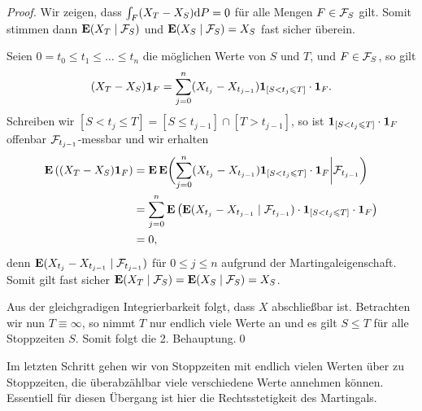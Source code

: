 \begin{proof}
Wir zeigen, dass $\int_F (X_T - X_S) \mathrm{d} P = 0$ für alle Mengen $F\in
\mathcal{F}_S$ gilt. Somit stimmen dann $\mathbf{E}(X_T\mid\mathcal{F}_S)$ und $\mathbf{E}(X_S\mid\mathcal{F}_S) = X_S$
fast sicher überein.

Seien $0 = t_0\le t_1 \le \ldots \le t_n$ die möglichen Werte von $S$ und $T$,
und $F\in\mathcal{F}_S$, so gilt
\begin{align*}
(X_T-X_S)\mathbf{1}_{F} = \sum_{j=0}^n (X_{t_j}-X_{t_{j-1}})\mathbf{1}_{[S < t_j \leqslant
T]}\cdot \mathbf{1}_F.
\end{align*}
Schreiben wir $[S < t_j \le T] = [S \le t_{j-1}]\cap[T >
t_{j-1}]$, so ist $\mathbf{1}_{[S < t_j \leqslant
T]}\cdot \mathbf{1}_F$ offenbar $\mathcal{F}_{t_{j-1}}$-messbar und wir erhalten
\begin{align*}
\mathbf{E} \left((X_T-X_S)\mathbf{1}_{F}\right) &= 
\mathbf{E}\, \mathbf{E} \biggl(\sum_{j=0}^n (X_{t_j}-X_{t_{j-1}})\mathbf{1}_{[S < t_j \leqslant
T]}\cdot \mathbf{1}_F \bigg|\mathcal{F}_{t_{j-1}}\biggr)\\
&= \sum_{j=0}^n \mathbf{E}\left( \mathbf{E}(X_{t_j}-X_{t_{j-1}}\mid \mathcal{F}_{t_{j-1}})\cdot\mathbf{1}_{[S <
t_j \leqslant T]}\cdot \mathbf{1}_F\right)\\
&= 0,
\end{align*}
denn $\mathbf{E}(X_{t_j}-X_{t_{j-1}}\mid \mathcal{F}_{t_{j-1}})$ für $0\le j\le n$ aufgrund der
Martingaleigenschaft. Somit gilt fast sicher $\mathbf{E}(X_T\mid\mathcal{F}_S)=\mathbf{E}(X_S\mid\mathcal{F}_S)
= X_S$.

Aus der gleichgradigen Integrierbarkeit folgt, dass $X$ abschließbar ist.
Betrachten wir nun $T\equiv \infty$, so nimmt $T$ nur endlich viele Werte an und
es gilt $S\le T$ für alle Stoppzeiten $S$. Somit folgt die 2. Behauptung.\qed
\end{proof}

Im letzten Schritt gehen wir von Stoppzeiten mit endlich vielen Werten über zu
Stoppzeiten, die überabzählbar viele verschiedene Werte annehmen können.
Essentiell für diesen Übergang ist hier die Rechtsstetigkeit des Martingals. 


